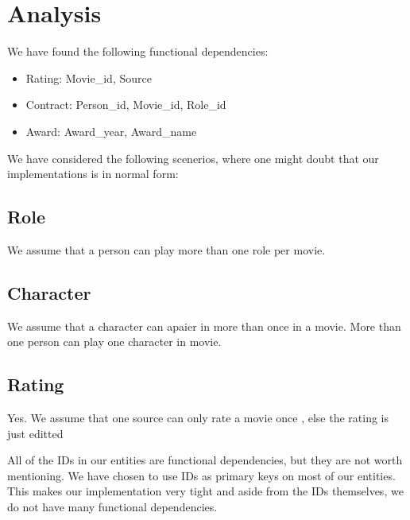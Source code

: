 \section{Analysis}
  We have found the following functional dependencies:
  \begin{itemize}
    \item Rating: Movie\_id, Source
    \item Contract: Person\_id, Movie\_id, Role\_id
    \item Award: Award\_year, Award\_name
  \end{itemize}
  We have considered the following scenerios, where one might doubt that our implementations is in normal form: \\
  \subsection{Role}
    \begin{itemize}
              {We assume that a person can play more than one role per movie.}
    \end{itemize}
  \subsection{Character}
    \begin{itemize}
              {We assume that a character can apaier in more than once in a movie.}
              {More than one person can play one character in movie.}
    \end{itemize}
  \subsection{Rating}
    \begin{itemize}
              {Yes. We assume that one source can only rate a movie once , else the rating is just editted}
    \end{itemize}
    All of the IDs in our entities are functional dependencies, but they are
    not worth mentioning.
    We have chosen to use IDs as primary keys on most of our entities. This
    makes our implementation very tight and aside from the IDs themselves, we
    do not have many functional dependencies.
\newpage
